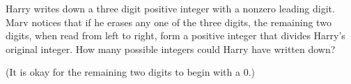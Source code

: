 Harry writes down a three digit positive integer with a nonzero leading digit. Marv notices that if he erases any one of the three digits, the remaining two digits, when read from left to right, form a positive integer that divides Harry's original integer. How many possible integers could Harry have written down?

(It is okay for the remaining two digits to begin with a $0$.)

